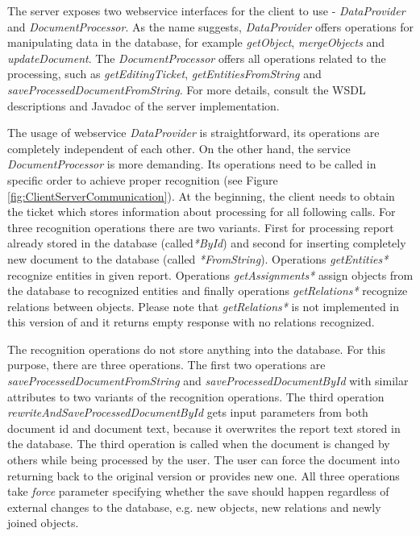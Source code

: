 The \textan{} server exposes two webservice interfaces for the client to use -
\emph{DataProvider} and \emph{DocumentProcessor}. As the name suggests,
\emph{DataProvider} offers operations for manipulating data in the database,
for example \emph{getObject}, \emph{mergeObjects} and \emph{updateDocument}.
The \emph{DocumentProcessor} offers all operations related to the processing,
such as \emph{getEditingTicket}, \emph{getEntitiesFromString} and
\emph{saveProcessedDocumentFromString}.
For more details, consult the WSDL descriptions and Javadoc of the server
implementation.

The usage of webservice \emph{DataProvider} is straightforward, its operations
are completely independent of each other. On the other hand, the service
\emph{DocumentProcessor} is more demanding. Its operations need to be
called in specific order to achieve proper recognition (see Figure
\ref{fig:ClientServerCommunication}). At the beginning, the client needs to obtain
the ticket which stores information about processing for all
following calls. For three recognition operations there are two variants. First
for processing report already stored in the database (called\emph{*ById}) and
second for inserting completely new document to the database (called
\emph{*FromString}). Operations \emph{getEntities*} recognize entities in
given report. Operations \emph{getAssignments*} assign objects from the database
to recognized entities and finally operations \emph{getRelations*} recognize
relations between objects. Please note that \emph{getRelations*} is not
implemented in this version of \textan{} and it returns empty response with no
relations recognized.

The recognition operations do not store anything into the database. For this
purpose, there are three operations. The first two operations are \emph{saveProcessedDocumentFromString} 
and \emph{saveProcessedDocumentById} with similar attributes to 
two variants of the recognition operations.
The third operation \emph{rewriteAndSaveProcessedDocumentById} gets input
parameters from both document id and document text, because it overwrites the report
text stored in the database. The third operation is called when the document is
changed by others while being processed by the user. The user can
force the document into returning back to the original version or provides new one. 
All three operations
take \emph{force} parameter specifying whether the save should happen regardless of
external changes to the database, e.g. new objects, new
relations and newly joined objects.


